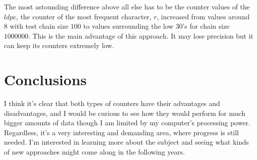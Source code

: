 \documentclass[...]{revdetua}
\begin{document}
The most astounding difference above all else has to be the counter values of the $ldpc$, the counter of the most frequent character, $r$, increased from values around $8$ with test chain size $100$ to values surrounding the low $30$'s for chain size $1000000$. This is the main advantage of this approach. It may lose precision but it can keep its counters extremely low.
\section{Conclusions}
I think it's clear that both types of counters have their advantages and disadvantages, and I would be curious to see how they would perform for much bigger amounts of data though I am limited by my computer's processing power.
Regardless, it's a very interesting and demanding area, where progress is still needed. I'm interested in learning more about the subject and seeing what kinds of new approaches might come along in the following years.




\end{document}
